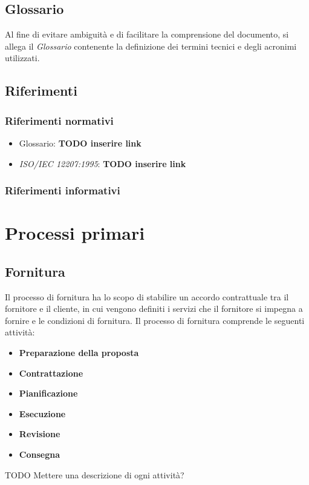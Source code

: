 \documentclass[italian,12pt]{article} %
\begin{document}
\subsection{Glossario}
Al fine di evitare ambiguità e di facilitare la comprensione del documento, si allega il \textit{Glossario} contenente la definizione dei termini tecnici e degli acronimi utilizzati.

\subsection{Riferimenti}
\subsubsection{Riferimenti normativi}
\begin{itemize}
	\item Glossario: \textbf{TODO inserire link}
	\item \textit{ISO/IEC 12207:1995}: \textbf{TODO inserire link}
\end{itemize}
\subsubsection{Riferimenti informativi}


\section{Processi primari}
\subsection{Fornitura}
Il processo di fornitura ha lo scopo di stabilire un accordo contrattuale tra il fornitore e il cliente, in cui vengono definiti i servizi che il fornitore si impegna a fornire e le condizioni di fornitura. 
Il processo di fornitura comprende le seguenti attività:
\begin{itemize}
	\itemsep0em
	\item \textbf{Preparazione della proposta}
	\item \textbf{Contrattazione}
	\item \textbf{Pianificazione}
	\item \textbf{Esecuzione}
	\item \textbf{Revisione}
	\item \textbf{Consegna}
\end{itemize}
TODO Mettere una descrizione di ogni attività?
\end{document}
